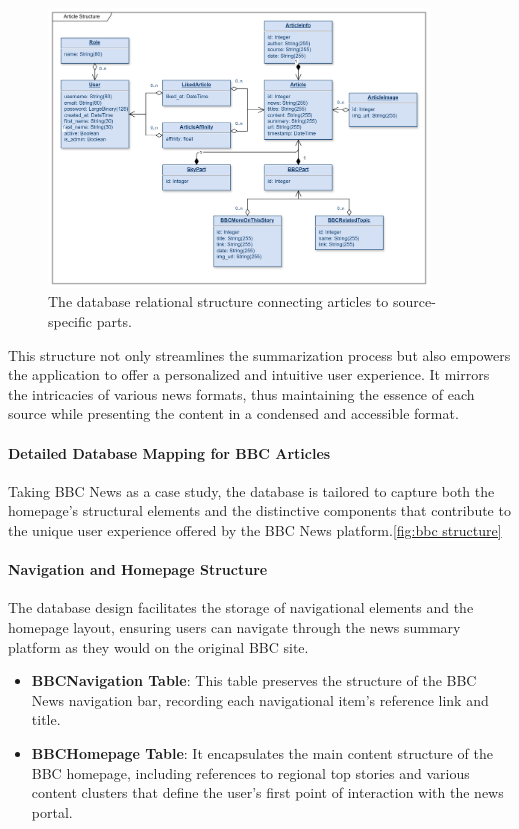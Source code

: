 \documentclass[10pt]{article}
\begin{document}
\begin{figure}[H]
    \centering
    \includegraphics[width=0.9\textwidth]{../Article Structure.png}
    \caption{The database relational structure connecting articles to source-specific parts.}
    \label{fig:article db structure}
\end{figure}

This structure not only streamlines the summarization process but also empowers the application to offer a personalized and intuitive user experience. It mirrors the intricacies of various news formats, thus maintaining the essence of each source while presenting the content in a condensed and accessible format.

\paragraph{Detailed Database Mapping for BBC Articles}

Taking BBC News as a case study, the database is tailored to capture both the homepage's structural elements and the distinctive components that contribute to the unique user experience offered by the BBC News platform.\ref{fig:bbc structure}

\paragraph{Navigation and Homepage Structure}
The database design facilitates the storage of navigational elements and the homepage layout, ensuring users can navigate through the news summary platform as they would on the original BBC site.

\begin{itemize}
    \item \textbf{BBCNavigation Table}: This table preserves the structure of the BBC News navigation bar, recording each navigational item's reference link and title.
    \item \textbf{BBCHomepage Table}: It encapsulates the main content structure of the BBC homepage, including references to regional top stories and various content clusters that define the user's first point of interaction with the news portal.
\end{itemize}
\end{document}
